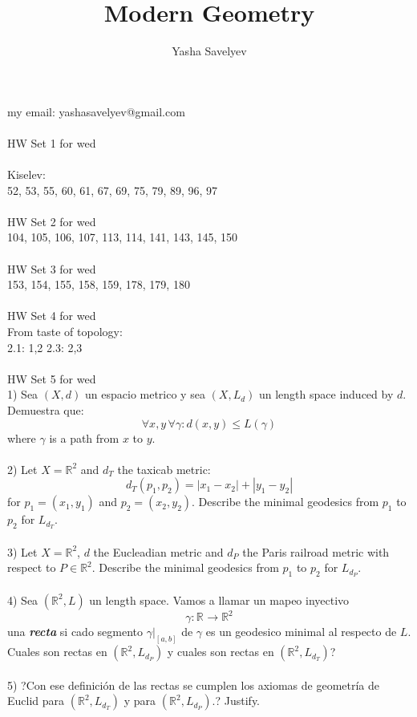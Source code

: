 \documentclass{amsart}
\title{Modern Geometry}
\author{Yasha Savelyev}
\begin{document}
\maketitle
\section{}
my email: yashasavelyev@gmail.com
\\\\
HW Set 1 for wed
\\\\
Kiselev: 
\\
52, 53, 55, 60, 61, 67, 69, 75, 79, 89, 96, 97
\\\\
HW Set 2 for wed
\\
104, 105, 106, 107, 113, 114, 141, 143, 145, 150
\\\\
HW Set 3 for wed
\\
153, 154, 155, 158, 159, 178, 179, 180
\\\\
HW Set 4 for wed
\\
From taste of topology:
\\
2.1: 1,2 
2.3: 2,3 
\\\\
HW Set 5 for wed
\\
1) Sea $(X, d) $ un espacio metrico y sea $(X, L _{d})$ un length space induced by $d$. Demuestra que: $$\forall x,y \, \forall \gamma: d (x,y) \leq L (\gamma)$$ where $\gamma$  is a path from $x$ to $y$. 
\\\\
2) Let $X = \mathbb{R} ^{2}$ and $d _{T}$ the taxicab metric:
$$d _{T} (p _{1}, p _{2}) = |x _{1} - x _{2}| + |y _{1} - y _{2}|$$ for $p _{1} = (x _{1}, y _{1}) $ and $p _{2} = (x _{2}, y _{2})$.
Describe the minimal geodesics from $p _{1}$ to $p _{2}$ for $L _{d _{T}}$. 
\\\\
3) Let $X = \mathbb{R} ^{2}$, $d$  the Eucleadian metric and $d _{P}$ the Paris railroad metric with respect to $P \in \mathbb{R} ^{2}$. Describe the minimal geodesics from $p _{1}$  to $p _{2}$ for $L _{d _{P}}$. 
\\\\
4) Sea $(\mathbb{R} ^{2}, L) $ un length space. Vamos a llamar un mapeo inyectivo $$\gamma: \mathbb{R} ^{} \to \mathbb{R} ^{2} $$ una \textbf{\emph{recta}} si cado segmento $\gamma | _{[a,b]}$ de $\gamma$ es un geodesico minimal al respecto de $L$. Cuales son rectas en $(\mathbb{R} ^{2}, L _{d _{P}}) $
y cuales son rectas en $(\mathbb{R} ^{2}, L _{d _{T}}) $?
\\\\
5) ?Con ese definición de las rectas se cumplen los axiomas de geometría de Euclid para $(\mathbb{R} ^{2}, L _{d _{T}}) $ y para $(\mathbb{R} ^{2}, L _{d _{P}}) $.? Justify.
\\\\
\end{document}
